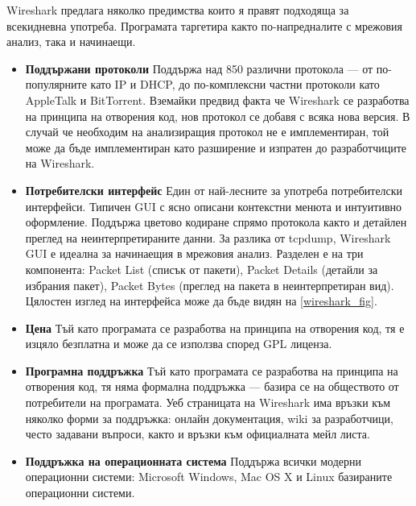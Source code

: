 \documentclass[12pt,a4paper,oneside]{book}
\begin{document}
Wireshark предлага няколко предимства които я правят подходяща за всекидневна
употреба. Програмата таргетира както по-напредналите с мрежовия анализ, така и
начинаещи.

\begin{itemize}
  \item \textbf{Поддържани протоколи} Поддържа над 850 различни протокола --- от
    по-популярните като IP и DHCP, до по-комплексни частни протоколи като
    AppleTalk и BitTorrent. Вземайки предвид факта че Wireshark се разработва на
    принципа на отворения код, нов протокол се добавя с всяка нова версия. В
    случай че необходим на анализиращия протокол не е имплементиран, той може да
    бъде имплементиран като разширение и изпратен до разработчиците на
    Wireshark.
  \item \textbf{Потребителски интерфейс} Един от най-лесните за употреба
    потребителски интерфейси. Типичен GUI с ясно
    описани контекстни менюта и интуитивно оформление. Поддържа цветово кодиране
    спрямо протокола както и детайлен преглед на неинтерпретираните данни. За
    разлика от tcpdump, Wireshark GUI е идеална за начинаещия в мрежовия анализ.
    Разделен е на три компонента: Packet List (списък от пакети),
    Packet Details (детайли за избрания пакет), Packet Bytes (преглед на пакета
    в неинтерпретиран вид). Цялостен изглед на интерфейса може да бъде видян на
    \autoref{wireshark_fig}.
  \item \textbf{Цена} Тъй като програмата се разработва на принципа на отворения
    код, тя е изцяло безплатна и може да се използва според GPL лиценза.
  \item \textbf{Програмна поддръжка} Тъй като програмата се разработва на
    принципа на отворения код, тя няма формална поддръжка ---
    базира се на обществото от потребители на програмата. Уеб страницата на
    Wireshark има връзки към няколко форми за поддръжка: онлайн документация,
    wiki за разработчици, често задавани въпроси, както и връзки към официалната мейл листа.
  \item \textbf{Поддръжка на операционната система} Поддържа всички модерни
    операционни системи: Microsoft Windows, Mac OS X и Linux базираните
    операционни системи.
\end{itemize}
\end{document}
